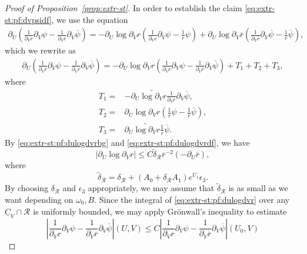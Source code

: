 \documentclass[10pt, reqno]{amsart}
\theoremstyle{definition}
\theoremstyle{remark}
\theoremstyle{conjecture}
\numberwithin{equation}{section}
\newcommand{\abs}[1]{\vert#1\vert}
\newcommand{\rd}{\partial}
\newcommand{\0}{\emptyset}
\newcommand{\dlt}{\delta}
\newcommand{\eps}{\epsilon}
\newcommand{\omg}{\omega}
\newcommand{\calR}{\mathcal R}
\newcommand{\uC}{\underline{C}}
\newcommand{\psibg}{\overline{\psi}}				%
\newcommand{\rbg}{\overline{r}}					%
\newcommand{\Abs}[1]{\left\vert #1 \right\vert}
\begin{document}
\begin{proof}[Proof of Proposition~\ref{prop:extr-st}]
In order to establish the claim \eqref{eq:extr-st:pf:dvpsidf}, we use the equation
\begin{align*}
	\rd_{U} \left(\frac{1}{\rd_{V} r} \rd_{V} \psi - \frac{1}{\rd_{V} \rbg} \rd_{V} \psibg \right)
	=- \rd_{U} \log \rd_{V} r \left( \frac{1}{\rd_{V} r} \rd_{V} \psi - \frac{1}{r} \psi \right)  + \rd_{U} \log \rd_{V} \rbg \left( \frac{1}{\rd_{V} \rbg} \rd_{V} \psibg - \frac{1}{\rbg} \psibg \right),
\end{align*}
which we rewrite as
\begin{align*}
	\rd_{U} \left(\frac{1}{\rd_{V} r} \rd_{V} \psi - \frac{1}{\rd_{V} \rbg} \rd_{V} \psibg \right)
	= - \rd_{U} \log \rd_{V} r \left(  \frac{1}{\rd_{V} r} \rd_{V} \psi - \frac{1}{\rd_{V} \rbg} \rd_{V} \psibg \right)
	+ T_{1} + T_{2} + T_{3} ,
\end{align*}
where
\begin{align*}
	T_{1} = & - \rd_{U} \widetilde{\log \rd_{V} r} \frac{1}{\rd_{V} \rbg} \rd_{V} \psibg , \\
	T_{2} = & \rd_{U} \log \rd_{V} r \left( \frac{1}{r} \psi - \frac{1}{\rbg} \psibg \right), \\
	T_{3} = & \rd_{U} \widetilde{\log \rd_{V} r} \frac{1}{\rbg} \psibg .
\end{align*}
By \eqref{eq:extr-st:pf:dulogdvrbg} and \eqref{eq:extr-st:pf:dulogdvrdf}, we have
\begin{equation} \label{eq:extr-st:pf:dulogdvr}
	\abs{\rd_{U} \log \rd_{V} r}
	\leq C \widetilde{\dlt}_{\calR} \rbg^{-2} (-\rd_{U}\rbg),
\end{equation}
where 
\begin{equation} \label{eq:extr-st:pf:new-dlt}
\widetilde{\dlt}_{\calR} = \dlt_{\calR} + (A_{0} + \dlt_{\calR} A_{1}) e^{U_{1}} \eps_{3} .
\end{equation}
By choosing $\dlt_{\calR}$ and $\eps_{3}$ appropriately, we may assume that $\widetilde{\dlt}_{\calR}$ is as small as we want depending on $\omg_0, B$. Since the integral of \eqref{eq:extr-st:pf:dulogdvr} over any $\uC_{V} \cap \calR$ is uniformly bounded, we may apply Gr\"onwall's inequality to estimate
\begin{equation*}
	\Abs{\frac{1}{\rd_{V} r} \rd_{V} \psi - \frac{1}{\rd_{V} \rbg} \rd_{V} \psibg}(U, V)
	\leq C \Abs{\frac{1}{\rd_{V} r} \rd_{V} \psi - \frac{1}{\rd_{V} \rbg} \rd_{V} \psibg}(U_{0}, V)

\end{equation*}
\end{proof}
\end{document}
